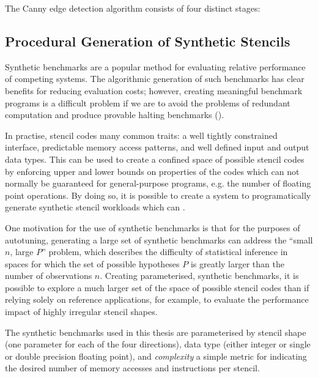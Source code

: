 The Canny edge detection algorithm consists of four distinct stages:


\subsection{Procedural Generation of Synthetic Stencils}

Synthetic benchmarks are a popular method for evaluating relative
performance of competing systems. The algorithmic generation of such
benchmarks has clear benefits for reducing evaluation costs; however,
creating meaningful benchmark programs is a difficult problem if we
are to avoid the problems of redundant computation and produce
provable halting benchmarks ().

In practise, stencil codes many common traits: a well tightly
constrained interface, predictable memory access patterns, and well
defined input and output data types. This can be used to create a
confined space of possible stencil codes by enforcing upper and lower
bounds on properties of the codes which can not normally be guaranteed
for general-purpose programs, e.g. the number of floating point
operations. By doing so, it is possible to create a system to
programatically generate synthetic stencil workloads which can .

One motivation for the use of synthetic benchmarks is that for the
purposes of autotuning, generating a large set of synthetic benchmarks
can address the ``small $n$, large $P$'' problem, which describes the
difficulty of statistical inference in spaces for which the set of
possible hypotheses $P$ is greatly larger than the number of
observations $n$\CitationNeeded. Creating parameterised, synthetic
benchmarks, it is possible to explore a much larger set of the space
of possible stencil codes than if relying solely on reference
applications, for example, to evaluate the performance impact of
highly irregular stencil shapes.


The synthetic benchmarks used in this thesis are parameterised by
stencil shape (one parameter for each of the four directions), data
type (either integer or single or double precision floating point),
and \emph{complexity} a simple metric for indicating the desired
number of memory accesses and instructions per stencil.


